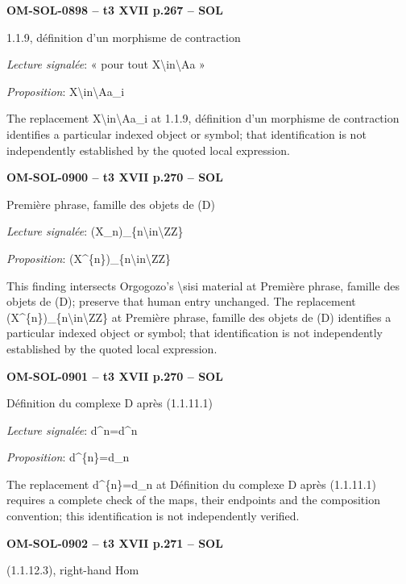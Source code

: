 \par\noindent\textbf{OM-SOL-0898 -- t3 XVII p.267 -- SOL}\par
1.1.9, définition d'un morphisme de contraction\par
\emph{Lecture signalée}: « pour tout X\textbackslash{}in\textbackslash{}Aa »\par
\emph{Proposition}: X\textbackslash{}in\textbackslash{}Aa\_i\par
The replacement X\textbackslash{}in\textbackslash{}Aa\_i at 1.1.9, définition d'un morphisme de contraction identifies a particular indexed object or symbol; that identification is not independently established by the quoted local expression.\par
\par\noindent\textbf{OM-SOL-0900 -- t3 XVII p.270 -- SOL}\par
Première phrase, famille des objets de (D)\par
\emph{Lecture signalée}: (X\_n)\_\{n\textbackslash{}in\textbackslash{}ZZ\}\par
\emph{Proposition}: (X\textasciicircum{}\{n\})\_\{n\textbackslash{}in\textbackslash{}ZZ\}\par
This finding intersects Orgogozo's \textbackslash{}sisi material at Première phrase, famille des objets de (D); preserve that human entry unchanged. The replacement (X\textasciicircum{}\{n\})\_\{n\textbackslash{}in\textbackslash{}ZZ\} at Première phrase, famille des objets de (D) identifies a particular indexed object or symbol; that identification is not independently established by the quoted local expression.\par
\par\noindent\textbf{OM-SOL-0901 -- t3 XVII p.270 -- SOL}\par
Définition du complexe D après (1.1.11.1)\par
\emph{Lecture signalée}: d\textasciicircum{}n=\allowbreak d\textasciicircum{}n\par
\emph{Proposition}: d\textasciicircum{}\{n\}=\allowbreak d\_n\par
The replacement d\textasciicircum{}\{n\}=\allowbreak d\_n at Définition du complexe D après (1.1.11.1) requires a complete check of the maps, their endpoints and the composition convention; this identification is not independently verified.\par
\par\noindent\textbf{OM-SOL-0902 -- t3 XVII p.271 -- SOL}\par
(1.1.12.3), right-hand Hom\par
